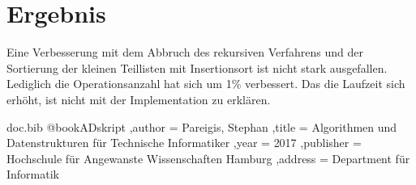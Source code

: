 \documentclass[
   draft=false
  ,paper=a4
  ,twoside=false
  ,fontsize=11pt
  ,headsepline
  ,DIV=11
  ,parskip=full+
  ,titlepage
]{scrartcl} %
\begin{document}
\section{Ergebnis}

Eine Verbesserung mit dem Abbruch des rekursiven Verfahrens und der Sortierung der kleinen Teillisten mit Insertionsort ist nicht stark ausgefallen. Lediglich die Operationsanzahl hat sich um 1\% verbessert. 
Das die Laufzeit sich erhöht, ist nicht mit der Implementation zu erklären.

\begin{filecontents}{doc.bib}
@book{ADskript
  ,author    = {Pareigis, Stephan}
  ,title     = {Algorithmen und Datenstrukturen für Technische Informatiker}
  ,year      = {2017}
  ,publisher = {Hochschule für Angewanste Wissenschaften Hamburg}
  ,address   = {Department für Informatik}
}
\end{filecontents}
	
	


\end{document}
